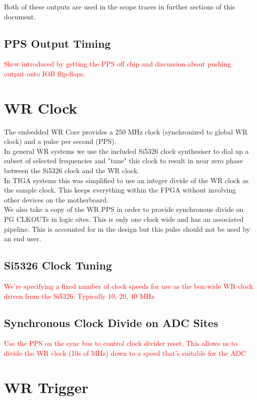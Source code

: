 \documentclass[]{article}
\begin{document}
Both of these outputs are used in the scope traces in further sections of this document.

\subsection{PPS Output Timing}\label{pps_out_timing}
\textcolor{red}{Skew introduced by getting the PPS off chip and discussion about pushing output onto IOB flip-flops.}

\section{WR Clock}
The embedded WR Core provides a 250 MHz clock (synchronized to global WR clock) and a pulse per second (PPS).\\

In general WR systems we use the included Si5326 clock synthesiser to dial up a subset of selected frequencies and "tune" this clock to result in near zero phase between the Si5326 clock and the WR clock.\\

In TIGA systems this was simplified to use an integer divide of the WR clock as the sample clock. This keeps everything within the FPGA without involving other devices on the motherboard.\\

We also take a copy of the WR PPS in order to provide synchronous divide on PG CLKOUTs in logic sites. This is only one clock wide and has an associated pipeline. This is accounted for in the design but this pulse should not be used by an end user.

\subsection{Si5326 Clock Tuning}
\textcolor{red}{We're specifying a fixed number of clock speeds for use as the box-wide WR clock driven from the Si5326. Typically 10, 20, 40 MHz}

\subsection{Synchronous Clock Divide on ADC Sites}
\textcolor{red}{Use the PPS on the sync bus to control clock divider reset. This allows us to divide the WR clock (10s of MHz) down to a speed that's suitable for the ADC}

\section{WR Trigger}
\end{document}
